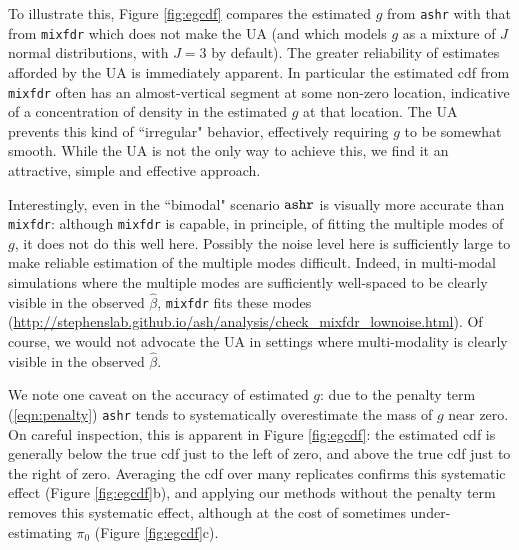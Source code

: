 \documentclass[11pt]{article}
\def\bhat{\hat{\beta}}
\def\mixfdr{{\tt mixfdr}\xspace}
\def\ashr{{\tt ashr}\xspace}
\begin{document}
To illustrate this, Figure \ref{fig:egcdf} compares the
estimated $g$ from \ashr  with that from \mixfdr which does not make the UA 
(and which models $g$ as a mixture of $J$ normal distributions, with $J=3$ by default).
The greater reliability of estimates afforded
by the UA is immediately apparent. In particular the estimated cdf from \mixfdr often has an almost-vertical
segment at some non-zero location, indicative of a concentration of density in the estimated $g$ at that location. 
The UA prevents this kind of ``irregular" behavior, effectively requiring $g$ to be somewhat smooth.
While the UA is not the only way to achieve this, we find it an attractive, simple and effective approach.

Interestingly, even in the ``bimodal" scenario $\ashr$ 
is visually more accurate than \mixfdr: although \mixfdr is capable, in principle, of fitting the multiple modes of $g$, it does not do this well here. 
Possibly the noise level here is sufficiently large to make reliable estimation of the multiple modes difficult. 
Indeed, in multi-modal simulations where the multiple modes are sufficiently well-spaced
to be clearly visible in the observed $\bhat$, \mixfdr fits these modes 
(\href{http://stephenslab.github.io/ash/analysis/check_mixfdr_lownoise.html}{http://stephenslab.github.io/ash/analysis/check\_mixfdr\_lownoise.html}). 
Of course, we would not advocate the UA in settings where multi-modality is 
clearly visible in the observed $\bhat$.

We note one caveat on the accuracy of estimated $g$: due to the penalty term (\ref{eqn:penalty}) \ashr tends to systematically
overestimate the mass of $g$ near zero. On careful inspection, this is apparent in Figure \ref{fig:egcdf}: the estimated cdf is generally below the true cdf just to the left of zero,
and above the true cdf just to the right of zero. Averaging the cdf over many replicates confirms this systematic effect (Figure \ref{fig:egcdf}b),
and applying our methods without the penalty term removes this systematic effect, although at the cost of sometimes 
under-estimating $\pi_0$ (Figure \ref{fig:egcdf}c). 
\end{document}
